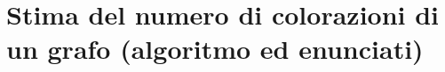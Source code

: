 \documentclass[\main/main.tex]{subfiles}
\begin{document}
\section{Stima del numero di colorazioni di un grafo (algoritmo ed enunciati)}
\end{document}
